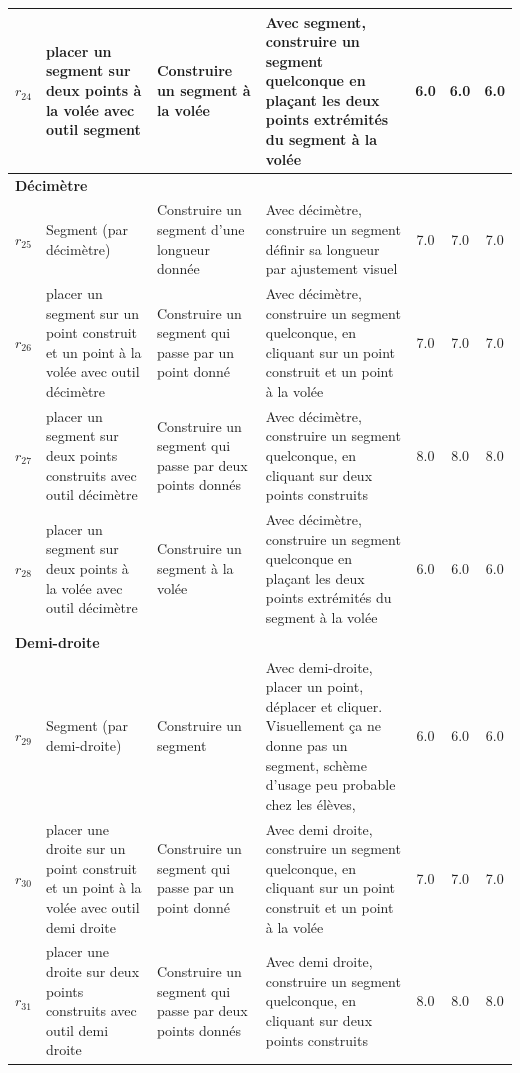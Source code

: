 \begin{longtable}{|c|p{3cm}|p{4cm}|p{4cm}|c|c|c|}
$r_{24}$\label{op_sgt-pts_vol_out_seg} & placer un segment sur deux points à la volée avec outil segment & Construire un segment à la volée & Avec segment, construire un segment quelconque en plaçant les deux points extrémités du segment à la volée & 6.0 & 6.0 & 6.0 \\ \hline
\multicolumn{7}{|l|}{\textbf{Décimètre}} \\ \hline
$r_{25}$\label{op_seg_dec} & Segment (par décimètre) & Construire un segment d'une longueur donnée & Avec décimètre, construire un segment définir sa longueur par ajustement visuel & 7.0 & 7.0 & 7.0 \\ \hline
$r_{26}$\label{op_sgt-pt_const_pt_vol_out_dec} & placer un segment sur un point construit et un point à la volée avec outil décimètre & Construire un segment qui passe par un point donné & Avec décimètre, construire un segment quelconque, en cliquant sur un point construit et un point à la volée & 7.0 & 7.0 & 7.0 \\ \hline
$r_{27}$\label{op_sgt-pts_const_out_dec} & placer un segment sur deux points construits avec outil décimètre & Construire un segment qui passe par deux points donnés & Avec décimètre, construire un segment quelconque, en cliquant sur deux points construits & 8.0 & 8.0 & 8.0 \\ \hline
$r_{28}$\label{op_sgt-pts_vol_out_dec} & placer un segment sur deux points à la volée avec outil décimètre & Construire un segment à la volée & Avec décimètre, construire un segment quelconque en plaçant les deux points extrémités du segment à la volée & 6.0 & 6.0 & 6.0 \\ \hline
\multicolumn{7}{|l|}{\textbf{Demi-droite}} \\ \hline
$r_{29}$\label{op_seg_ demi_dte} & Segment (par demi-droite) & Construire un segment & Avec demi-droite, placer un point, déplacer et cliquer. Visuellement ça ne donne pas un segment, schème d'usage peu probable chez les élèves, & 6.0 & 6.0 & 6.0 \\ \hline
$r_{30}$\label{op_dte_pt_const_pt_vol_out_demidte} & placer une droite sur un point construit et un point à la volée avec outil demi droite & Construire un segment qui passe par un point donné & Avec demi droite, construire un segment quelconque, en cliquant sur un point construit et un point à la volée & 7.0 & 7.0 & 7.0 \\ \hline
$r_{31}$\label{op_dte_pts_const_out_demidte} & placer une droite sur deux points construits avec outil demi droite & Construire un segment qui passe par deux points donnés & Avec demi droite, construire un segment quelconque, en cliquant sur deux points construits & 8.0 & 8.0 & 8.0 \\ \hline

\end{longtable}
